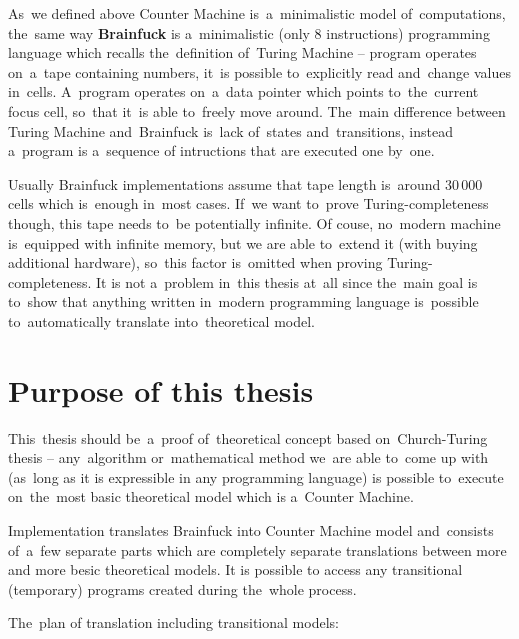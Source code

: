 \documentclass[english,shortabstract,mgr]{iithesis}
\begin{document}
As~we defined above Counter Machine is~a~minimalistic model of~computations, the~same way
\textbf{Brainfuck} \cite{brainfuckWiki} is a~minimalistic (only 8 instructions) programming
language which recalls
the~definition of~Turing Machine -- program operates on~a~tape containing numbers, it~is possible
to~explicitly read and~change values in~cells. A~program operates on~a~data pointer which
points to~the~current focus cell, so~that it~is able to~freely move around. The~main difference
between Turing Machine and~Brainfuck is~lack of~states and~transitions, instead a~program
is a~sequence of intructions that are executed one by~one.

Usually Brainfuck implementations assume that tape length is~around $30\,000$ cells which
is~enough in~most cases. If~we want to~prove Turing-completeness though, this tape
needs to~be potentially infinite. Of couse, no~modern machine is~equipped with infinite memory,
but we are able to~extend it (with buying additional hardware), so~this factor is~omitted
when proving Turing-completeness. It is not a~problem in~this thesis at~all since
the~main goal is to~show that anything written in~modern programming language is~possible
to~automatically translate into~theoretical model.

\section {Purpose of this thesis}

This~thesis should be~a~proof of~theoretical concept based on~Church-Turing thesis -- any~algorithm
or~mathematical method we~are able to~come up with (as~long as it is expressible in any programming
language) is possible to~execute on~the~most basic theoretical model which is a~Counter Machine.

Implementation translates Brainfuck into Counter Machine model and~consists of~a~few separate parts
which are completely separate translations between more and more besic theoretical models.
It is possible to access any transitional (temporary) programs created during the~whole process.

The~plan of translation including transitional models:

\hspace{-1.5cm}
\end{document}
